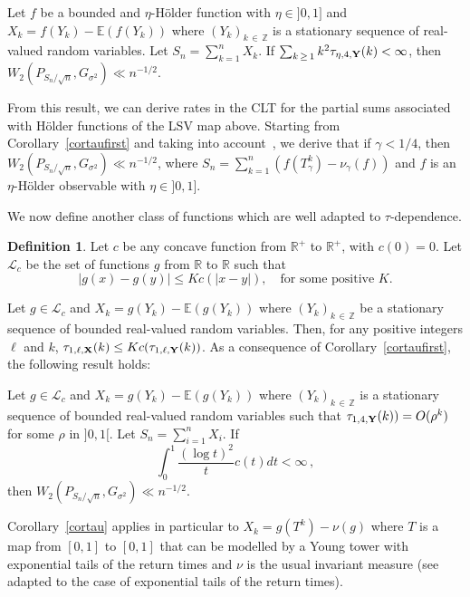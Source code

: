 \documentclass[10pt]{amsart}
\theoremstyle{definition}\newtheorem{defi}[theo]{Definition}\newtheorem{rema}[theo]{Remark}\newtheorem{exam}[theo]{Example}\newtheorem{exem}[theo]{Example}\newtheorem{nota}[theo]{Notation}
\newcommand{\bbE}{\mathbb{E}}
\newcommand{\bbZ}{\mathbb{Z}}
\newcommand{\clL}{\mathcal{L}}
\newcommand{\bbR}{\mathbb{R}}
\begin{document}
\begin{coro}\label{cortaufirst}
Let $f$ be a bounded and $\eta$-H\"older function with $\eta \in]0,1]$ and $X_k= f(Y_k) - \bbE (f(Y_k))$ where $(Y_k)_{k\,\in\,\bbZ}$ is a stationary sequence of real-valued random variables. Let $S_n = \sum_{k=1}^n X_k$. If $\sum_{k\,\geq\,1} k^2 \tau_{\eta, 4,{\bf Y}} (k) < \infty$, then $ W_2 (P_{S_n / {\sqrt n} }, G_{\sigma^2}) \ll n^{-1/2}$.
\end{coro}

From this result, we can derive rates in the CLT for the partial sums associated with H\"older functions of the LSV map above. Starting from Corollary~\ref{cortaufirst} and taking into account~\cite[Prop.~5.3 and Inequality~(4.2)]{DM15}, we derive that if $ \gamma <1/4$, then $ W_2 (P_{S_n / {\sqrt n} }, G_{\sigma^2}) \ll n^{-1/2}$, where $S_n = \sum_{k=1}^n (f(T^k_{\gamma}) -\nu_\gamma (f)) $ and $f$ is an $\eta$-H\"older observable with $\eta \in]0,1]$.


We now define another class of functions which are well adapted to $\tau$-dependence.



\begin{defi}
Let $c$ be any concave function from $\bbR^+$ to $\bbR^+$, with $c(0)=0$. Let $\clL_c$ be the set of functions $g$ from $\bbR$ to $\bbR$ such that
\[
|g(x)-g(y)| \leq K c(|x-y|), \quad \text{for some positive $K$.}
\]
\end{defi}


Let $g \in \clL_c$ and $X_k= g(Y_k) - \bbE (g(Y_k))$ where $(Y_k)_{k\,\in\,\bbZ}$ be a stationary sequence of bounded real-valued random variables. Then, for any positive integers $\ell$ and $k$, $\tau_{1,\ell,{\bf X}} (k) \leq K c (\tau_{1,\ell,{\bf Y}} (k)) $. As a consequence of Corollary~\ref{cortaufirst}, the following result holds:



\begin{coro}\label{cortau}
Let $g \in \clL_c$ and $X_k= g(Y_k) - \bbE (g(Y_k))$ where $(Y_k)_{k\,\in\,\bbZ}$ is a stationary sequence of bounded real-valued random variables such that $ \tau_{1,4,{\bf Y}} (k)) = O (\rho^k)$ for some $\rho$ in $]0,1[$. Let $S_n = \sum_{i=1}^n X_i$. If
\[
\int_0^1 \frac{ (\log t)^2}{t} c(t) dt < \infty \,,
\]
then $W_2 (P_{S_n / {\sqrt n} }, G_{\sigma^2}) \ll n^{-1/2}$.
\end{coro}

Corollary~\ref{cortau} applies in particular to $X_k= g (T^k) - \nu(g) $ where $T$ is a map from $[0,1]$ to $[0,1]$ that can be modelled by a Young tower with exponential tails of the return times and $\nu$ is the usual invariant measure (see~\cite[Section~4]{DM15} adapted to the case of exponential tails of the return times).
\end{document}
